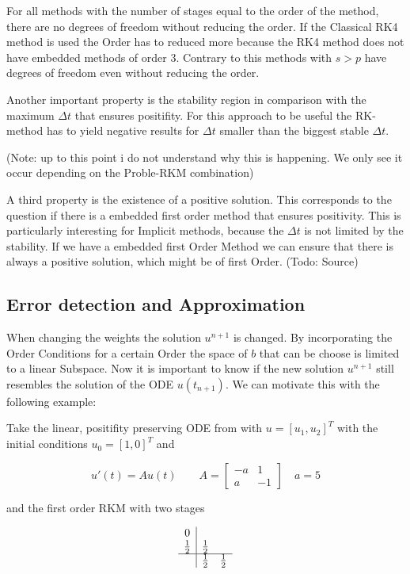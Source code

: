 \documentclass{article}
\begin{document}
For all methods with the number of stages equal to the order of the method, there are no degrees of freedom without reducing the order. 
If the Classical RK4 method is used the Order has to reduced more because the RK4 method does not have embedded methods of order 3.
Contrary to this methods with $s > p$ have degrees of freedom even without reducing the order. 

Another important property is the stability region in comparison with the maximum $\Delta t$ that ensures positifity. For this approach to be useful the RK-method has to yield negative results for $\Delta t$ smaller than the biggest stable $\Delta t$.

(Note: up to this point i do not understand why this is happening. We only see it occur depending on the Proble-RKM combination)

A third property is the existence of a positive solution. This corresponds to the question if there is a embedded first order method that ensures positivity. This is particularly interesting for Implicit methods, because the $\Delta t$ is not limited by the stability. 
If we have a embedded first Order Method we can ensure that there is always a positive solution, which might be of first Order. (Todo: Source)

\subsection{Error detection and Approximation}
When changing the weights the solution $u^{n+1}$ is changed. 
By incorporating the Order Conditions for a certain Order the space of $b$ that can be choose is limited to a linear Subspace. 
Now it is important to know if the new solution $u^{n+1}$ still resembles the solution of the ODE $u(t_{n+1})$. 
We can motivate this with the following example:

Take the linear, positifity preserving ODE from \cite{kopecz_unconditionally_2018} with $u = [u_1,u_2]^T$ with the initial conditions $u_0 = [1,0]^T$ and

\begin{equation}
u'(t) = A u(t) \qquad A = \left[\begin{matrix}- a & 1\\a & -1\end{matrix}\right] \quad a =5
\end{equation}

and the first order RKM with two stages

\begin{align}
\begin{array}{c|cc}
0 &  & \\
\frac{1}{2} & \frac{1}{2} & \\
\hline
 & \frac{1}{2} & \frac{1}{2}\\
\end{array}
\end{align}
\end{document}
